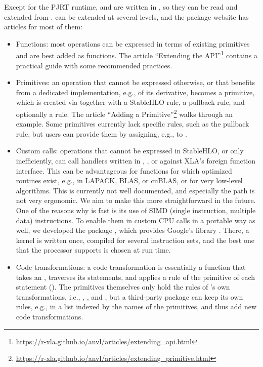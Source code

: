 \documentclass[article,shortnames]{jss}
\begin{document}
Except for the PJRT runtime,  and  are written in , so they can be read and extended from .
 can be extended at several levels, and the package website has articles for most of them:
\begin{itemize}
\item Functions: most operations can be expressed in terms of existing primitives and are best added as  functions. The article ``Extending the API''\footnote{\url{https://r-xla.github.io/anvl/articles/extending_api.html}} contains a practical guide with some recommended practices.
\item Primitives: an operation that cannot be expressed otherwise, or that benefits from a dedicated implementation, e.g., of its derivative, becomes a primitive, which is created via  together with a StableHLO rule, a pullback rule, and optionally a  rule. The article ``Adding a Primitive''\footnote{\url{https://r-xla.github.io/anvl/articles/extending_primitive.html}} walks through an example. Some primitives currently lack specific rules, such as the pullback rule, but users can provide them by assigning, e.g., to .
\item Custom calls: operations that cannot be expressed in StableHLO, or only inefficiently, can call handlers written in , , or  against XLA's foreign function interface. This can be advantageous for functions for which optimized routines exist, e.g., in LAPACK, BLAS, or cuBLAS, or for very low-level algorithms.
      This is currently not well documented, and especially the  path is not very ergonomic. We aim to make this more straightforward in the future.
      One of the reasons why  is fast is its use of SIMD (single instruction, multiple data) instructions.
      To enable them in custom CPU calls in a portable way as well, we developed the  package  \citep{ref-highway-r}, which provides Google's  library  \citep{ref-highway}.
      There, a kernel is written once, compiled for several instruction sets, and the best one that the processor supports is chosen at run time.
\item Code transformations: a code transformation is essentially a function that takes an , traverses its statements, and applies a rule of the primitive of each statement ().
      The primitives themselves only hold the rules of 's own transformations, i.e., , , and , but a third-party package can keep its own rules, e.g., in a list indexed by the names of the primitives, and thus add new code transformations.

\end{itemize}
\end{document}
